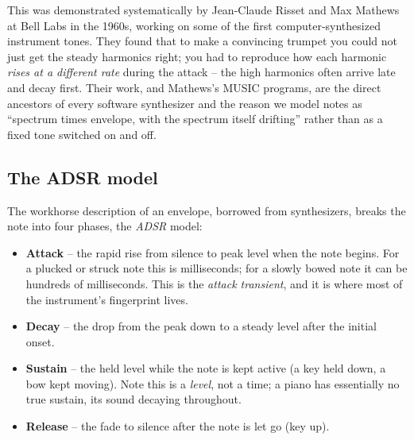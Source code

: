 \begin{historybox}
This was demonstrated systematically by Jean-Claude Risset and Max Mathews at Bell Labs in the
1960s, working on some of the first computer-synthesized instrument tones. They found that to make a
convincing trumpet you could not just get the steady harmonics right; you had to reproduce how each
harmonic \emph{rises at a different rate} during the attack -- the high harmonics often arrive late
and decay first. Their work, and Mathews's MUSIC programs, are the direct ancestors of every software
synthesizer and the reason we model notes as ``spectrum times envelope, with the spectrum itself
drifting'' rather than as a fixed tone switched on and off.
\end{historybox}

\subsection*{The ADSR model}

The workhorse description of an envelope, borrowed from synthesizers, breaks the note into four
phases, the \emph{ADSR} model:

\begin{itemize}
  \item \textbf{Attack} -- the rapid rise from silence to peak level when the note begins. For a
    plucked or struck note this is milliseconds; for a slowly bowed note it can be hundreds of
    milliseconds. This is the \emph{attack transient}, and it is where most of the instrument's
    fingerprint lives.
  \item \textbf{Decay} -- the drop from the peak down to a steady level after the initial onset.
  \item \textbf{Sustain} -- the held level while the note is kept active (a key held down, a bow kept
    moving). Note this is a \emph{level}, not a time; a piano has essentially no true sustain, its
    sound decaying throughout.
  \item \textbf{Release} -- the fade to silence after the note is let go (key up).
\end{itemize}

